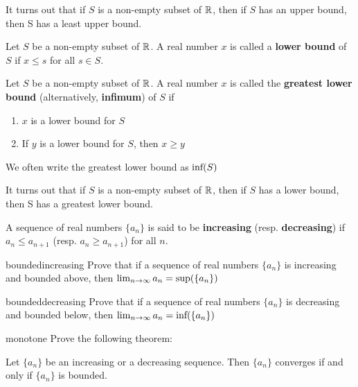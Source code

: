 It turns out that if $S$ is a non-empty subset of $\mathbb{R}$, then if $S$ has an upper bound, then S has a least upper bound.

\begin{definition}
Let $S$ be a non-empty subset of $\mathbb{R}$.  A real number $x$ is called a \textbf{lower bound} of $S$ if $x \leq s$ for all $s \in S$.
\end{definition}

\begin{definition}
Let $S$ be a non-empty subset of $\mathbb{R}$.  A real number $x$ is called the \textbf{greatest lower bound} (alternatively, \textbf{infimum}) of $S$ if
\begin{enumerate}
    \item $x$ is a lower bound for $S$
    \item If $y$ is a lower bound for $S$, then $x \geq y$
\end{enumerate}

We often write the greatest lower  bound as $\textnormal{inf}(S)$
\end{definition}

It turns out that if $S$ is a non-empty subset of $\mathbb{R}$, then if $S$ has a lower bound, then S has a greatest lower bound.


\begin{definition}
    A sequence of real numbers $\{a_n\}$ is said to be \textbf{increasing} (resp. \textbf{decreasing}) if $a_n \leq a_{n+1}$ (resp. $a_n \geq a_{n+1}$) for all $n$.
    \end{definition}
    
\begin{problem}{boundedincreasing}
Prove that if a sequence of real numbers $\{a_n\}$ is increasing and bounded above, then $\lim_{n \to \infty} a_n = \textnormal{sup}(\{a_n\})$
\end{problem}

\begin{problem}{boundeddecreasing}
Prove that if a sequence of real numbers $\{a_n\}$ is decreasing and bounded below, then $\lim_{n \to \infty} a_n = \textnormal{inf}(\{a_n\})$
\end{problem}


\begin{problem}{monotone}
Prove the following theorem:

Let $\{a_n\}$ be an increasing or a decreasing sequence.  Then $\{a_n\}$ converges if and only if $\{a_n\}$ is bounded.
\end{problem}

